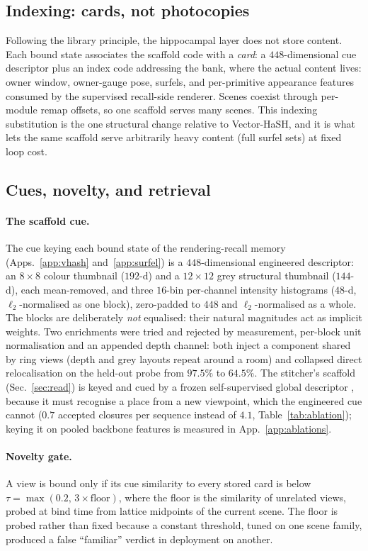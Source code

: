 \subsection{Indexing: cards, not photocopies}
Following the library principle, the hippocampal layer does not store
content. Each bound state associates the scaffold code with a
\emph{card}: a $448$-dimensional cue descriptor plus an index code
addressing the bank, where the actual content lives: owner window, owner-gauge pose, surfels, and per-primitive appearance features consumed by the supervised recall-side renderer. Scenes coexist through per-module remap offsets, so one scaffold serves many scenes.
This indexing substitution is the one structural
change relative to Vector-HaSH, and it is what lets the same scaffold
serve arbitrarily heavy content (full surfel sets) at fixed loop cost.

\subsection{Cues, novelty, and retrieval}
\label{app:cue}
\paragraph{The scaffold cue.}
The cue keying each bound state of the rendering-recall memory
(Apps.~\ref{app:vhash} and~\ref{app:surfel}) is a $448$-dimensional
engineered descriptor: an $8{\times}8$ colour thumbnail ($192$-d) and a
$12{\times}12$ grey structural thumbnail ($144$-d), each mean-removed, and
three $16$-bin per-channel intensity histograms ($48$-d, $\ell_2$-normalised
as one block), zero-padded to $448$ and $\ell_2$-normalised as a whole. The
blocks are deliberately \emph{not} equalised: their natural magnitudes act as
implicit weights. Two enrichments were tried and rejected by measurement,
per-block unit normalisation and an appended depth channel: both inject a
component shared by ring views (depth and grey layouts repeat around a room)
and collapsed direct relocalisation on the held-out probe from $97.5\%$ to
$64.5\%$. The stitcher's scaffold (Sec.~\ref{sec:read}) is keyed and cued
by a frozen self-supervised global descriptor \citep{dinov2}, because it
must recognise a place from a new viewpoint, which the engineered cue cannot
($0.7$ accepted closures per sequence instead of $4.1$,
Table~\ref{tab:ablation}); keying it on pooled backbone features is measured
in App.~\ref{app:ablations}.

\paragraph{Novelty gate.}
A view is bound only if its cue similarity to every stored card is below
$\tau=\max(0.2,\,3\times\mathrm{floor})$, where the floor is the
similarity of unrelated views, probed at bind time from lattice
midpoints of the current scene. The floor is probed rather than fixed
because a constant threshold, tuned on one scene family, produced a
false ``familiar'' verdict in deployment on another.


